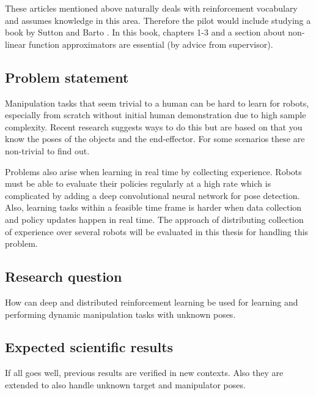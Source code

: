 These articles mentioned above naturally deals with reinforcement vocabulary
and assumes knowledge in this area. Therefore the pilot would include studying
a book by Sutton and Barto \cite{sutton1998reinforcement}. In this book,
chapters 1-3 and a section about non-linear function approximators are
essential (by advice from supervisor).

\subsection{Problem statement}

Manipulation tasks that seem trivial to a human can be hard to learn for
robots, especially from scratch without initial human demonstration due to high
sample complexity. Recent research suggests ways to do this but are based on
that you know the poses of the objects and the end-effector. For some scenarios
these are non-trivial to find out.

Problems also arise when learning in real time by collecting experience. Robots
must be able to evaluate their policies regularly at a high rate which is
complicated by adding a deep convolutional neural network for pose detection.
Also, learning tasks within a feasible time frame is harder when data
collection and policy updates happen in real time. The approach of
distributing collection of experience over several robots will be evaluated in
this thesis for handling this problem.

\subsection{Research question}

How can deep and distributed reinforcement learning be used for learning and
performing dynamic manipulation tasks with unknown poses.

\subsection{Expected scientific results}

If all goes well, previous results are verified in new contexts. Also
they are extended to also handle unknown target and manipulator poses.
